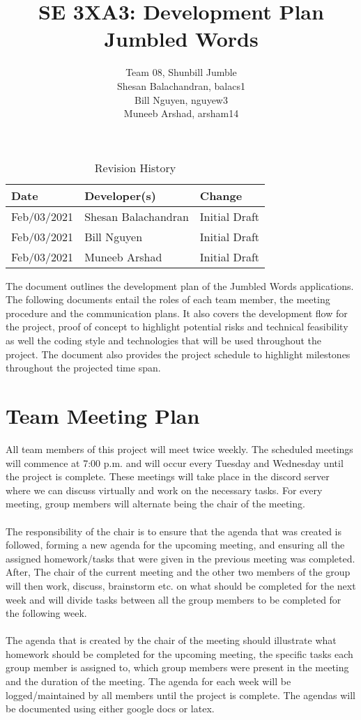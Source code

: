 \documentclass{article}
\title{SE 3XA3: Development Plan\\Jumbled Words}
\author{Team 08, Shunbill Jumble
	\\Shesan Balachandran, balacs1
	\\Bill Nguyen, nguyew3
	\\Muneeb Arshad, arsham14
}
\date{}
\begin{document}
	
	\begin{table}[hp]
		\caption{Revision History} \label{TblRevisionHistory}
		\begin{tabularx}{\textwidth}{llX}
			\toprule
			\textbf{Date} & \textbf{Developer(s)} & \textbf{Change}\\
			\midrule
			Feb/03/2021 & Shesan Balachandran & Initial Draft\\
			Feb/03/2021 & Bill Nguyen & Initial Draft\\
			Feb/03/2021 & Muneeb Arshad & Initial Draft\\
			\bottomrule
		\end{tabularx}
	\end{table}


\newpage

\maketitle

The document outlines the development plan of the Jumbled Words applications. The following documents entail the roles of each team member, the meeting procedure and the communication plans. It also covers the development flow for the project, proof of concept to highlight potential risks and technical feasibility as well the coding style and technologies that will be used throughout the project. The document also provides the project schedule to highlight milestones throughout the projected time span.

\section{Team Meeting Plan}

All team members of this project will meet twice weekly. The scheduled meetings will commence at 7:00 p.m. and will occur every Tuesday and Wednesday until the project is complete. These meetings will take place in the discord server where we can discuss virtually and work on the necessary tasks. For every meeting, group members will alternate being the chair of the meeting.\\ 
\\
The responsibility of the chair is to ensure that the agenda that was created is followed, forming a new agenda for the upcoming meeting, and ensuring all the assigned homework/tasks that were given in the previous meeting was completed. After, The chair of the current meeting and the other two members of the group will then work, discuss, brainstorm etc. on what should be completed for the next week and will divide tasks between all the group members to be completed for the following week.\\
\\
The agenda that is created by the chair of the meeting should illustrate what homework should be completed for the upcoming meeting, the specific tasks each group member is assigned to, which group members were present in the meeting and the duration of the meeting. The agenda for each week will be logged/maintained by all members until the project is complete. The agendas will be documented using either google docs or latex.
\end{document}

